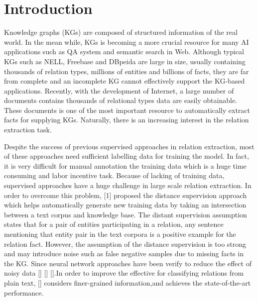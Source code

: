 \section{Introduction}
Knowledge graphs (KGs) are composed of structured information of the real world. In the mean while, KGs is becoming a more crucial resource for many AI applications such as QA system and semantic search in Web. Although typical KGs such as NELL, Freebase and DBpeida are large in size, usually containing thousands of relation types, millions of entities and billions of facts, they are far from complete and an incomplete KG cannot effectively support the KG-based applications. Recently, with the development of Internet, a large number of documents contains thousands of relational types data are easily obtainable. These documents is one of the most important resource to automatically extract facts for supplying KGs. Naturally, there is an increasing interest in the relation extraction task.

Despite the success of previous supervised approaches in relation extraction, most of these approaches need sufficient labelling data for training the model. In fact, it is very difficult for manual annotation the training data which is a huge time consuming and labor incentive task. Because of lacking of training data, supervised approaches have a huge challenge in large scale relation extraction. In order to overcome this problem, [1] proposed the distance supervision approach which helps automatically generate new training data by taking an intersection between a text corpus and knowledge base. The distant supervision assumption states that for a pair of entities participating in a relation, any sentence mentioning that entity pair in the text corpora is a positive example for the relation fact. However, the assumption of the distance supervision is too strong and may introduce noise such as false negative samples due to missing facts in the KG. Since neural network approaches have been verify to reduce the effect of noisy data [] [] [].In order to improve the effective for classifying relations from plain text, [] considers finer-grained information,and achieves the state-of-the-art performance.

